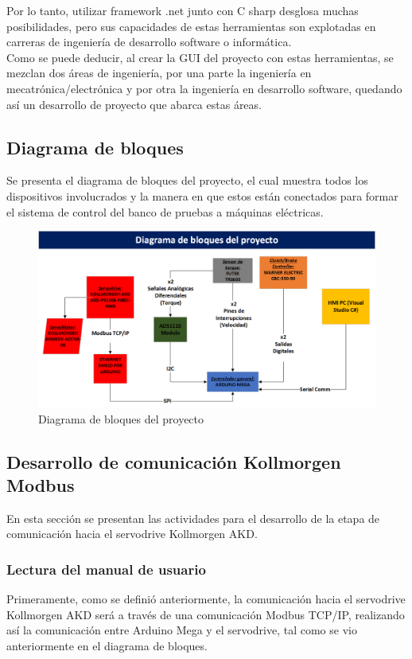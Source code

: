 \documentclass[12pt,titlepage]{article}
\begin{document}
Por lo tanto, utilizar framework .net junto con C sharp desglosa muchas posibilidades, pero sus capacidades de estas herramientas son explotadas en carreras de ingeniería de desarrollo software o informática. \\

Como se puede deducir, al crear la GUI del proyecto con estas herramientas, se mezclan dos áreas de ingeniería, por una parte la ingeniería en mecatrónica/electrónica y por otra la ingeniería en desarrollo software, quedando así un desarrollo de proyecto que abarca estas áreas. \\  

\newpage

\subsection{Diagrama de bloques}
Se presenta el diagrama de bloques del proyecto, el cual muestra todos los dispositivos involucrados  y la manera en que estos están conectados para formar el sistema de control del banco de pruebas a máquinas eléctricas. \\ 

 \begin{figure}[htbp]
\hspace*{1.1cm} 
\includegraphics[scale=0.58]{bloques_diagram}
\caption{Diagrama de bloques del proyecto}
\end{figure}
\newpage
\subsection{Desarrollo de comunicación Kollmorgen Modbus}
En esta sección se presentan las actividades para el desarrollo de la etapa de comunicación hacia el servodrive Kollmorgen AKD. 

\subsubsection{Lectura del manual de usuario}
Primeramente, como se definió anteriormente, la comunicación hacia el servodrive Kollmorgen AKD será a través de una comunicación Modbus TCP/IP, realizando así la comunicación entre Arduino Mega y el servodrive, tal como se vio anteriormente en el diagrama de bloques. \\ 
\end{document}

